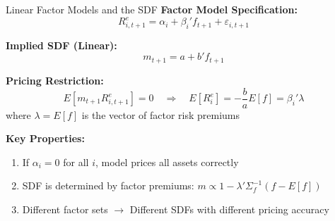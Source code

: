 \documentclass{beamer}
\begin{document}
\begin{frame}{Linear Factor Models and the SDF}
    \textbf{Factor Model Specification:}
    \begin{equation}\label{eq:factor_model}
        R^e_{i,t+1} = \alpha_i + \beta_i' f_{t+1} + \varepsilon_{i,t+1}
    \end{equation}
    
    \textbf{Implied SDF (Linear):}
    \begin{equation}\label{eq:sdf_linear}
        m_{t+1} = a + b' f_{t+1}
    \end{equation}
    
    
    \textbf{Pricing Restriction:}
    \begin{equation*}
        E[m_{t+1} R^e_{i,t+1}] = 0 \quad \Rightarrow \quad E[R^e_i] = -\frac{b}{a} E[f] = \beta_i' \lambda
    \end{equation*}
    where $\lambda = E[f]$ is the vector of factor risk premiums
    
    \vspace{0.3cm}
    \textbf{Key Properties:}
    \begin{enumerate}
        \item If $\alpha_i = 0$ for all $i$, model prices all assets correctly
        \item SDF is determined by factor premiums: $m \propto 1 - \lambda' \Sigma_f^{-1} (f - E[f])$
        \item Different factor sets $\rightarrow$ Different SDFs with different pricing accuracy
    \end{enumerate}
\end{frame}
\end{document}
